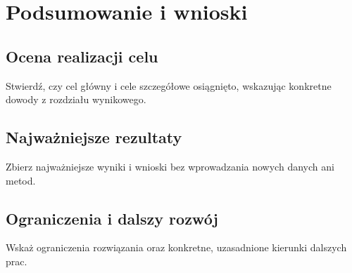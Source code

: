 \chapter{Podsumowanie i wnioski}
\label{chap:podsumowanie}

\section{Ocena realizacji celu}
Stwierdź, czy cel główny i cele szczegółowe osiągnięto, wskazując konkretne dowody z rozdziału wynikowego.

\section{Najważniejsze rezultaty}
Zbierz najważniejsze wyniki i wnioski bez wprowadzania nowych danych ani metod.

\section{Ograniczenia i dalszy rozwój}
Wskaż ograniczenia rozwiązania oraz konkretne, uzasadnione kierunki dalszych prac.
